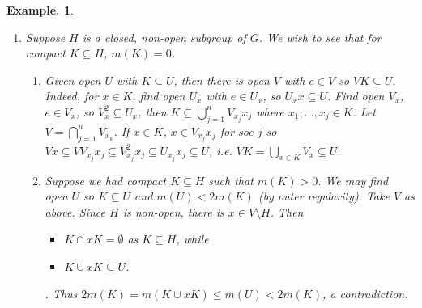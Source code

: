 \documentclass[11pt, a4paper]{memoir}
\theoremstyle{change}
\theoremstyle{plain}
\theoremstyle{nonumberplain}
\newtheorem{example}{Example.}
\numberwithin{equation}{section}
\begin{document}
\begin{example}
\begin{enumerate}[nl,r]
\begin{align*}
                \{t\in T:U\cap tH\neq\emptyset\} &= \{t\in T:M(U\cap tH)>0\}\\
                                                 &= \bigcup_{n=1}^\infty\{t\in T:m(U\cap tH)<\frac{1}{n}\}
            \end{align*}
            is countable, so if $E\in\mathcal{B}(G)$, $m(E)<\infty$, $E\subseteq\bigcup_{j=1}^\infty t_jH$ and then
            \begin{align*}
                m(E)&=\sum_{j=1}^\infty m(E\cap t_jH)=\sum_{j=1}^\infty m(t_j^{-1}(E\cap t_j H))\\
                    &=\sum_{j=1}^\infty m_H((t_j^{-1}E)\cap H)
            \end{align*}
        \item Suppose $H$ is a closed, non-open subgroup of $G$.
            We wish to see that for compact $K\subseteq H$, $m(K)=0$.
            \begin{enumerate}[nl,a]
                \item Given open $U$ with $K\subseteq U$, then there is open $V$ with $e\in V$ so $VK\subseteq U$.
                    Indeed, for $x\in K$, find open $U_x$ with $e\in U_x$, so $U_xx\subseteq U$.
                    Find open $V_x$, $e\in V_x$, so $V_x^2\subseteq U_x$, then $K\subseteq\bigcup_{j=1}^n V_{x_j}x_j$ where $x_1,\ldots,x_j\in K$.
                    Let $V=\bigcap_{j=1}^n V_{x_k}$.
                    If $x\in K$, $x\in V_{x_j}x_j$ for soe $j$ so $Vx\subseteq VV_{x_j}x_j\subseteq V_{x_j}^2x_j\subseteq U_{x_j}x_j\subseteq U$, i.e. $VK=\bigcup_{x\in K}V_x\subseteq U$.
                \item Suppose we had compact $K\subseteq H$ such that $m(K)>0$.
                    We may find open $U$ so $K\subseteq U$ and $m(U)<2m(K)$ (by outer regularity).
                    Take $V$ as above.
                    Since $H$ is non-open, there is $x\in V\setminus H$.
                    Then
                    \begin{itemize}[nl]
                        \item $K\cap xK=\emptyset$ as $K\subseteq H$, while
                        \item $K\cup xK\subseteq U$.
                    \end{itemize}.
                    Thus $2m(K)=m(K\cup xK)\leq m(U)<2m(K)$, a contradiction.


\end{enumerate}
\end{enumerate}
\end{example}
\end{document}
